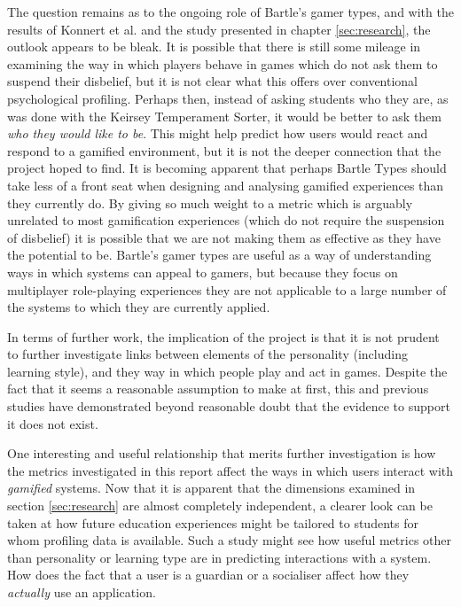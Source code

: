 \documentclass[12pt,a4paper,twoside]{report}
\begin{document}
The question remains as to the ongoing role of Bartle's gamer types, and with the results of Konnert et al. \cite{konertmodeling} and the study presented in chapter \ref{sec:research}, the outlook appears to be bleak. It is possible that there is still some mileage in examining the way in which players behave in games which do not ask them to suspend their disbelief, but it is not clear what this offers over conventional psychological profiling. Perhaps then, instead of asking students who they are, as was done with the Keirsey Temperament Sorter, it would be better to ask them \textit{who they would like to be}. This might help predict how users would react and respond to a gamified environment, but it is not the deeper connection that the project hoped to find. It is becoming apparent that perhaps Bartle Types should take less of a front seat when designing and analysing gamified experiences than they currently do. By giving so much weight to a metric which is arguably unrelated to most gamification experiences (which do not require the suspension of disbelief) it is possible that we are not making them as effective as they have the potential to be. Bartle's gamer types are useful as a way of understanding ways in which systems can appeal to gamers, but because they focus on multiplayer role-playing experiences they are not applicable to a large number of the systems to which they are currently applied.

In terms of further work, the implication of the project is that it is not prudent to further investigate links between elements of the personality (including learning style), and they way in which people play and act in games. Despite the fact that it seems a reasonable assumption to make at first, this and previous studies have demonstrated beyond reasonable doubt that the evidence to support it does not exist.

One interesting and useful relationship that merits further investigation is how the metrics investigated in this report affect the ways in which users interact with \textit{gamified} systems. Now that it is apparent that the dimensions examined in section \ref{sec:research} are almost completely independent, a clearer look can be taken at how future education experiences might be tailored to students for whom profiling data is available. Such a study might see how useful metrics other than personality or learning type are in predicting interactions with a system. How does the fact that a user is a guardian or a socialiser affect how they \textit{actually} use an application.
\end{document}
